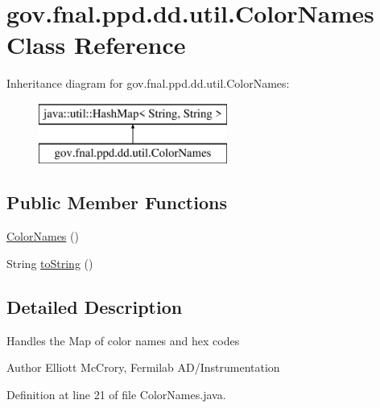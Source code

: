 \hypertarget{classgov_1_1fnal_1_1ppd_1_1dd_1_1util_1_1ColorNames}{\section{gov.\-fnal.\-ppd.\-dd.\-util.\-Color\-Names Class Reference}
\label{classgov_1_1fnal_1_1ppd_1_1dd_1_1util_1_1ColorNames}
}
Inheritance diagram for gov.\-fnal.\-ppd.\-dd.\-util.\-Color\-Names\-:\begin{figure}[H]
\begin{center}
\leavevmode
\includegraphics[height=2.000000cm]{classgov_1_1fnal_1_1ppd_1_1dd_1_1util_1_1ColorNames}
\end{center}
\end{figure}
\subsection*{Public Member Functions}
\begin{DoxyCompactItemize}
\item 
\hyperlink{classgov_1_1fnal_1_1ppd_1_1dd_1_1util_1_1ColorNames_a4dd6370e3a87d04a7b0bf746d4d2c4eb}{Color\-Names} ()
\item 
String \hyperlink{classgov_1_1fnal_1_1ppd_1_1dd_1_1util_1_1ColorNames_a63fe2b1ed60e8a0f22e267cbfccb1580}{to\-String} ()
\end{DoxyCompactItemize}


\subsection{Detailed Description}
Handles the Map of color names and hex codes

\begin{DoxyAuthor}{Author}
Elliott Mc\-Crory, Fermilab A\-D/\-Instrumentation 
\end{DoxyAuthor}


Definition at line 21 of file Color\-Names.\-java.



